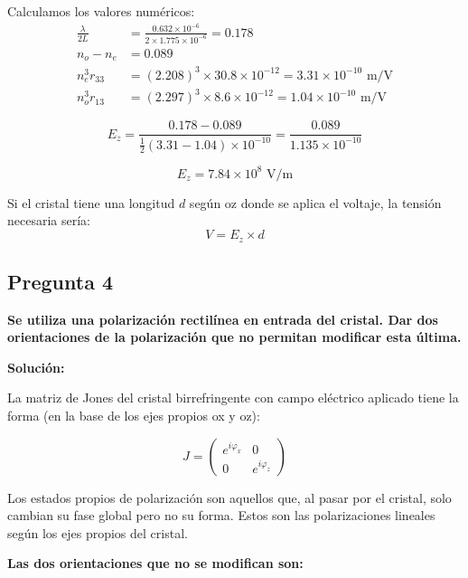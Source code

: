\documentclass[12pt,a4paper]{article}
\begin{document}
Calculamos los valores numéricos:
\begin{align}
\frac{\lambda}{2L} &= \frac{0.632 \times 10^{-6}}{2 \times 1.775 \times 10^{-6}} = 0.178 \\
n_o - n_e &= 0.089 \\
n_e^3 r_{33} &= (2.208)^3 \times 30.8 \times 10^{-12} = 3.31 \times 10^{-10} \text{ m/V} \\
n_o^3 r_{13} &= (2.297)^3 \times 8.6 \times 10^{-12} = 1.04 \times 10^{-10} \text{ m/V}
\end{align}

\begin{equation}
E_z = \frac{0.178 - 0.089}{\frac{1}{2}(3.31 - 1.04) \times 10^{-10}} = \frac{0.089}{1.135 \times 10^{-10}}
\end{equation}

\begin{equation}
\boxed{E_z = 7.84 \times 10^{8} \text{ V/m}}
\end{equation}

Si el cristal tiene una longitud $d$ según oz donde se aplica el voltaje, la tensión necesaria sería:
\begin{equation}
V = E_z \times d
\end{equation}

\subsection*{Pregunta 4}
\textbf{Se utiliza una polarización rectilínea en entrada del cristal. Dar dos orientaciones de la polarización que no permitan modificar esta última.}

\vspace{0.3cm}
\textbf{Solución:}

La matriz de Jones del cristal birrefringente con campo eléctrico aplicado tiene la forma (en la base de los ejes propios ox y oz):

\begin{equation}
J = \begin{pmatrix}
e^{i\varphi_x} & 0 \\
0 & e^{i\varphi_z}
\end{pmatrix}
\end{equation}

Los estados propios de polarización son aquellos que, al pasar por el cristal, solo cambian su fase global pero no su forma. Estos son las polarizaciones lineales según los ejes propios del cristal.

\textbf{Las dos orientaciones que no se modifican son:}
\end{document}
